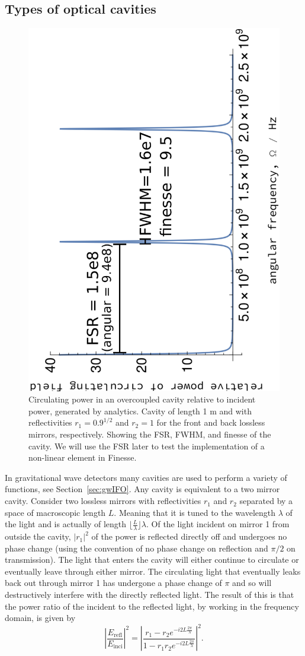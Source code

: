 \documentclass[aps,pra,superscriptaddress,reprint,nofootinbib]{revtex4-1}
\newcommand{\abs}[1]{\left\lvert #1 \right\rvert}
\begin{document}
\subsection{Types of optical cavities}

\begin{figure}[h]
	\begin{center}
	\includegraphics[height=0.45\textwidth, angle=-90]{figures/cavity_fsr_fwhm_finesse.pdf}
	\end{center}
	\caption{Circulating power in an overcoupled cavity relative to incident power, generated by analytics. Cavity of length 1 m and with reflectivities $r_1 = 0.9^{1/2}$ and $r_2 = 1$ for the front and back lossless mirrors, respectively. Showing the FSR, FWHM, and finesse of the cavity. We will use the FSR later to test the implementation of a non-linear element in Finesse.}
	\label{fig:cavity_fsr_fwhm_finesse}
\end{figure}

In gravitational wave detectors many cavities are used to perform a variety of functions, see Section~\ref{sec:gwIFO}. Any cavity is equivalent to a two mirror cavity. Consider two lossless mirrors with reflectivities $r_1$ and $r_2$ separated by a space of macroscopic length $L$. Meaning that it is tuned to the wavelength $\lambda$ of the light and is actually of length $\lfloor \frac{L}{\lambda} \rfloor \lambda$. Of the light incident on mirror 1 from outside the cavity, $\abs{r_1}^2$ of the power is reflected directly off and undergoes no phase change (using the convention of no phase change on reflection and $\pi/2$ on transmission). The light that enters the cavity will either continue to circulate or eventually leave through either mirror. The circulating light that eventually leaks back out through mirror 1 has undergone a phase change of $\pi$ and so will destructively interfere with the directly reflected light. The result of this is that the power ratio of the incident to the reflected light, by working in the frequency domain, is given by~\cite{Danilishin_2012}
$$\abs{\frac{E_{\mathrm{refl}}}{E_{\mathrm{inci}}}}^2 = \abs{\frac{r_1 - r_2 e^{-i 2 L \frac{2\pi}{\lambda}}}{1- r_1 r_2 e^{-i 2 L \frac{2\pi}{\lambda}}}}^2.$$ 
\end{document}

